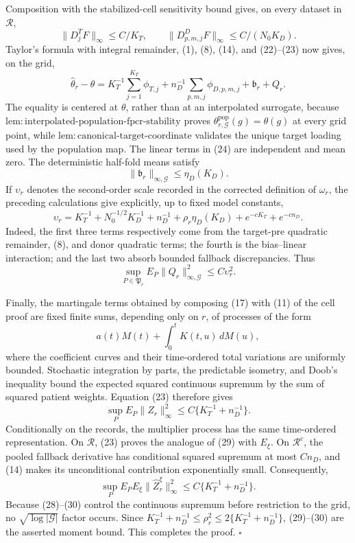 Composition with the stabilized-cell sensitivity bound gives, on every dataset
in \(\mathcal R\),
\[
 \|D_j^TF\|_\infty\leq C/K_T,
 \qquad
 \|D_{p,m,j}^DF\|_\infty\leq C/(N_0K_D).                 \tag{23}
\]
Taylor's formula with integral remainder, (1), (8), (14), and (22)--(23)
now gives, on the grid,
\[
 \widehat\theta_r-\theta
 =K_T^{-1}\sum_{j=1}^{K_T}\phi_{T,j}
  +n_D^{-1}\sum_{p,m,j}\phi_{D,p,m,j}
  +\mathfrak b_r+Q_r.                                     \tag{24}
\]
The equality is centered at \(\theta\), rather than at an interpolated surrogate,
because
\(\mathrm{lem:interpolated\mbox{-}population\mbox{-}fpcr\mbox{-}stability}\)
proves \(\theta^{\mathrm{pop}}_{r,\mathcal G}(g)=\theta(g)\) at every grid
point, while
\(\mathrm{lem:canonical\mbox{-}target\mbox{-}coordinate}\) validates the
unique target loading used by the population map.  The linear terms in (24) are
independent and mean zero.  The deterministic half-fold means satisfy
\[
 \|\mathfrak b_r\|_{\infty,\mathcal G}\leq\eta_D(K_D).   \tag{25}
\]
If \(\upsilon_r\) denotes the second-order scale recorded in the corrected
definition of \(\omega_r\), the preceding calculations give explicitly, up to
fixed model constants,
\[
 \upsilon_r
 =K_T^{-1}+N_0^{-1/2}K_D^{-1}+n_D^{-1}
  +\rho_r\eta_D(K_D)+e^{-cK_T}+e^{-cn_D}.                 \tag{26}
\]
Indeed, the first three terms respectively come from the target-pre quadratic
remainder, (8), and donor quadratic terms; the fourth is the bias--linear
interaction; and the last two absorb bounded fallback discrepancies.  Thus
\[
 \sup_{P\in\mathfrak P_r}E_P
 \|Q_r\|_{\infty,\mathcal G}^2\leq C\upsilon_r^2.         \tag{27}
\]

Finally, the martingale terms obtained by composing (17) with (11) of the cell
proof are fixed finite sums, depending only on \(r\), of processes of the form
\[
 a(t)M(t)+\int_0^tK(t,u)\,dM(u),                           \tag{28}
\]
where the coefficient curves and their time-ordered total variations are
uniformly bounded.  Stochastic integration by parts, the predictable isometry,
and Doob's inequality bound the expected squared continuous supremum by the sum
of squared patient weights.  Equation (23) therefore gives
\[
 \sup_PE_P\|Z_r\|_\infty^2
 \leq C\{K_T^{-1}+n_D^{-1}\}.                             \tag{29}
\]
Conditionally on the records, the multiplier process has the same
time-ordered representation.  On \(\mathcal R\), (23) proves the analogue of
(29) with \(E_\xi\).  On \(\mathcal R^c\), the pooled fallback derivative has
conditional squared supremum at most \(Cn_D\), and (14) makes its unconditional
contribution exponentially small.  Consequently,
\[
 \sup_PE_PE_\xi\|\widehat Z_r^\xi\|_\infty^2
 \leq C\{K_T^{-1}+n_D^{-1}\}.                             \tag{30}
\]
Because (28)--(30) control the continuous supremum before restriction to the
grid, no \(\sqrt{\log|\mathcal G|}\) factor occurs.  Since
\(K_T^{-1}+n_D^{-1}\leq\rho_r^2\leq
2\{K_T^{-1}+n_D^{-1}\}\), (29)--(30) are the asserted moment bound.  This
completes the proof. \(\square\)